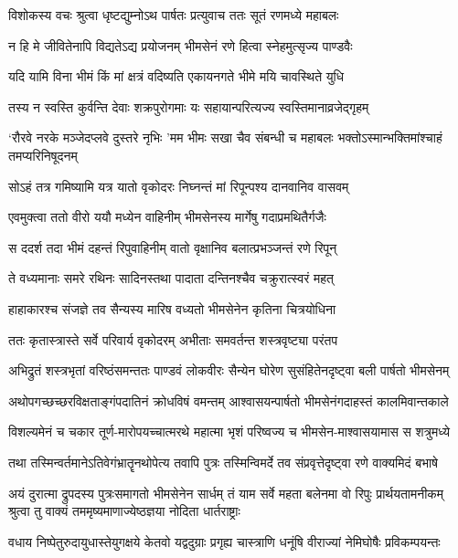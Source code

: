 \twolineshloka
{विशोकस्य वचः श्रुत्वा धृष्टद्युम्नोऽथ पार्षतः}
{प्रत्युवाच ततः सूतं रणमध्ये महाबलः}


\twolineshloka
{न हि मे जीवितेनापि विद्यतेऽद्य प्रयोजनम्}
{भीमसेनं रणे हित्वा स्नेहमुत्सृज्य पाण्डवैः}


\twolineshloka
{यदि यामि विना भीमं किं मां क्षत्रं वदिष्यति}
{एकायनगते भीमे मयि चावस्थिते युधि}


\twolineshloka
{तस्य न स्वस्ति कुर्वन्ति देवाः शक्रपुरोगमाः}
{यः सहायान्परित्यज्य स्वस्तिमानाव्रजेद्गृहम्}


\threelineshloka
{`रौरवे नरके मञ्जेदप्लवे दुस्तरे नृभिः}
{'मम भीमः सखा चैव संबन्धी च महाबलः}
{भक्तोऽस्मान्भक्तिमांश्चाहं तमप्यरिनिषूदनम्}


\twolineshloka
{सोऽहं तत्र गमिष्यामि यत्र यातो वृकोदरः}
{निघ्नन्तं मां रिपून्पश्य दानवानिव वासवम्}


\twolineshloka
{एवमुक्त्वा ततो वीरो ययौ मध्येन वाहिनीम्}
{भीमसेनस्य मार्गेषु गदाप्रमथितैर्गजैः}


\twolineshloka
{स ददर्श तदा भीमं दहन्तं रिपुवाहिनीम्}
{वातो वृक्षानिव बलात्प्रभञ्जन्तं रणे रिपून्}


\twolineshloka
{ते वध्यमानाः समरे रथिनः सादिनस्तथा}
{पादाता दन्तिनश्चैव चक्रुरात्स्वरं महत्}


\twolineshloka
{हाहाकारश्च संजज्ञे तव सैन्यस्य मारिष}
{वध्यतो भीमसेनेन कृतिना चित्रयोधिना}


\twolineshloka
{ततः कृतास्त्रास्ते सर्वे परिवार्य वृकोदरम्}
{अभीताः समवर्तन्त शस्त्रवृष्ट्या परंतप}


\twolineshloka
{अभिद्रुतं शस्त्रभृतां वरिष्ठंसमन्ततः पाण्डवं लोकवीरः}
{सैन्येन घोरेण सुसंहितेनदृष्ट्वा बली पार्षतो भीमसेनम्}


\twolineshloka
{अथोपगच्छच्छरविक्षताङ्गंपदातिनं क्रोधविषं वमन्तम्}
{आश्वासयन्पार्षतो भीमसेनंगदाहस्तं कालमिवान्तकाले}


\twolineshloka
{विशल्यमेनं च चकार तूर्ण-मारोपयच्चात्मरथे महात्मा}
{भृशं परिष्वज्य च भीमसेन-माश्वासयामास स शत्रुमध्ये}


\twolineshloka
{तथा तस्मिन्वर्तमानेऽतिवेगंभ्रातॄनथोपेत्य तवापि पुत्रः}
{तस्मिन्विमर्दे तव संप्रवृत्तेदृष्ट्वा रणे वाक्यमिदं बभाषे}


अयं दुरात्मा द्रुपदस्य पुत्रःसमागतो भीमसेनेन सार्धम्
\twolineshloka
{तं याम सर्वे महता बलेनमा वो रिपुः प्रार्थयतामनीकम्}
{श्रुत्वा तु वाक्यं तममृष्यमाणाज्येष्ठज्ञया नोदिता धार्तराष्ट्राः}


\twolineshloka
{वधाय निष्पेतुरुदायुधास्तेयुगक्षये केतवो यद्वदुग्राः}
{प्रगृह्य चास्त्राणि धनूंषि वीराज्यां नेमिघोषैः प्रविकम्पयन्तः}


